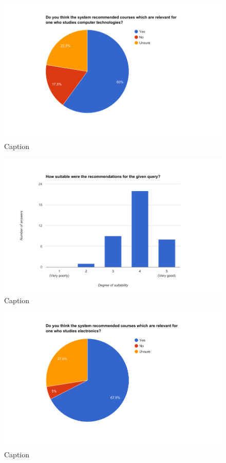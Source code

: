 \begin{figure}[h]
    \centering
    \includegraphics[width=1\textwidth]{fig/questionnaire2_diagrams/9.png}
    \caption[]{Caption}
    \label{fig:my_label}
\end{figure}

\begin{figure}[h]
    \centering
    \includegraphics[width=1\textwidth]{fig/questionnaire2_diagrams/10.png}
    \caption[]{Caption}
    \label{fig:my_label}
\end{figure}

\begin{figure}[h]
    \centering
    \includegraphics[width=1\textwidth]{fig/questionnaire2_diagrams/11.png}
    \caption[]{Caption}
    \label{fig:my_label}
\end{figure}

